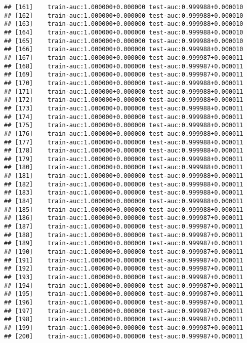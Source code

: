 \documentclass[11pt,]{article}
\begin{document}
\begin{verbatim}
## [161]    train-auc:1.000000+0.000000 test-auc:0.999988+0.000010 
## [162]    train-auc:1.000000+0.000000 test-auc:0.999988+0.000010 
## [163]    train-auc:1.000000+0.000000 test-auc:0.999988+0.000010 
## [164]    train-auc:1.000000+0.000000 test-auc:0.999988+0.000010 
## [165]    train-auc:1.000000+0.000000 test-auc:0.999988+0.000010 
## [166]    train-auc:1.000000+0.000000 test-auc:0.999988+0.000010 
## [167]    train-auc:1.000000+0.000000 test-auc:0.999987+0.000011 
## [168]    train-auc:1.000000+0.000000 test-auc:0.999987+0.000011 
## [169]    train-auc:1.000000+0.000000 test-auc:0.999987+0.000011 
## [170]    train-auc:1.000000+0.000000 test-auc:0.999988+0.000011 
## [171]    train-auc:1.000000+0.000000 test-auc:0.999988+0.000011 
## [172]    train-auc:1.000000+0.000000 test-auc:0.999988+0.000011 
## [173]    train-auc:1.000000+0.000000 test-auc:0.999988+0.000011 
## [174]    train-auc:1.000000+0.000000 test-auc:0.999988+0.000011 
## [175]    train-auc:1.000000+0.000000 test-auc:0.999988+0.000011 
## [176]    train-auc:1.000000+0.000000 test-auc:0.999988+0.000011 
## [177]    train-auc:1.000000+0.000000 test-auc:0.999988+0.000011 
## [178]    train-auc:1.000000+0.000000 test-auc:0.999988+0.000011 
## [179]    train-auc:1.000000+0.000000 test-auc:0.999988+0.000011 
## [180]    train-auc:1.000000+0.000000 test-auc:0.999988+0.000011 
## [181]    train-auc:1.000000+0.000000 test-auc:0.999988+0.000011 
## [182]    train-auc:1.000000+0.000000 test-auc:0.999988+0.000011 
## [183]    train-auc:1.000000+0.000000 test-auc:0.999988+0.000011 
## [184]    train-auc:1.000000+0.000000 test-auc:0.999988+0.000011 
## [185]    train-auc:1.000000+0.000000 test-auc:0.999988+0.000011 
## [186]    train-auc:1.000000+0.000000 test-auc:0.999987+0.000011 
## [187]    train-auc:1.000000+0.000000 test-auc:0.999987+0.000011 
## [188]    train-auc:1.000000+0.000000 test-auc:0.999987+0.000011 
## [189]    train-auc:1.000000+0.000000 test-auc:0.999987+0.000011 
## [190]    train-auc:1.000000+0.000000 test-auc:0.999987+0.000011 
## [191]    train-auc:1.000000+0.000000 test-auc:0.999987+0.000011 
## [192]    train-auc:1.000000+0.000000 test-auc:0.999987+0.000011 
## [193]    train-auc:1.000000+0.000000 test-auc:0.999987+0.000011 
## [194]    train-auc:1.000000+0.000000 test-auc:0.999987+0.000011 
## [195]    train-auc:1.000000+0.000000 test-auc:0.999987+0.000011 
## [196]    train-auc:1.000000+0.000000 test-auc:0.999987+0.000011 
## [197]    train-auc:1.000000+0.000000 test-auc:0.999987+0.000011 
## [198]    train-auc:1.000000+0.000000 test-auc:0.999987+0.000011 
## [199]    train-auc:1.000000+0.000000 test-auc:0.999987+0.000011 
## [200]    train-auc:1.000000+0.000000 test-auc:0.999987+0.000011
\end{verbatim}
\end{document}
